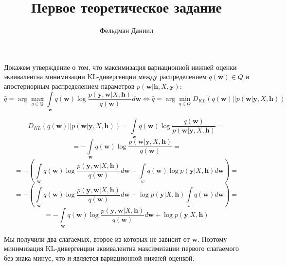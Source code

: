 \documentclass[12pt]{article}
\title{\Large Первое теоретическое задание}
\author{Фельдман Даниил}
\date{}
\def\w{{\mathbf{w} }}
\def\y{{\mathbf{y}}}
\def\h{{\mathbf h }}
\begin{document}
\maketitle

Докажем утверждение о том, что максимизация вариационной нижней оценки эквивалентна минимизации KL-дивергенции между распределением $q(\w)\in Q$ и апостериорным распределением параметров $p(\w |\h ,X,\y)$:
$$\hat{q} = \arg\max\limits_{q\in Q}\int\limits_{\w} q(\w)\log \frac{p(\y,\w|X,\h)}{q(\w)} d\w \Leftrightarrow \hat{q} = \arg\min\limits_{q\in Q} D_{KL} (q(\w)||p(\w|\y,X,\h))$$ 

$$D_{KL}(q(\w)||p(\w|\y,X,\h)) = \int\limits_{\w}q(\w)\log\frac{q(\w)}{p(\w|\y,X,\h)} = $$
$$= -\int\limits_{\w}q(\w)\log\frac{p(\w|\y,X,\h)}{q(\w)} =$$
$$= -(\int\limits_{\w}q(\w)\log\frac{p(\y,\w|X,\h)}{q(\w)}d\w - \int\limits_{w}q(\w)\log p(\y|X,\h)d\w) = $$
$$= -(\int\limits_{\w}q(\w)\log\frac{p(\y,\w|X,\h)}{q(\w)}d\w - \log p(\y|X,\h)\int\limits_{w}q(\w)d\w) = $$
$$= -\int\limits_{\w}q(\w)\log\frac{p(\y,\w|X,\h)}{q(\w)}d\w + \log p(\y|X,\h)$$

Мы получили два слагаемых, второе из которых не зависит от $\w$. Поэтому минимизация KL-дивергенции эквивалентна максимизации первого слагаемого без знака минус, что и является вариационной нижней оценкой.
\end{document}
